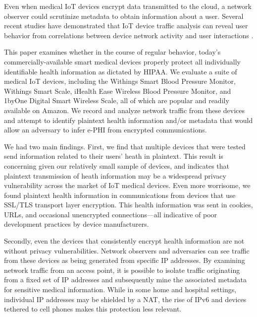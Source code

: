 Even when medical IoT devices encrypt data transmitted to the cloud, a network observer could scrutinize metadata to obtain information about a user.  Several recent studies have demonstrated that IoT device traffic analysis can reveal user behavior  from correlations between device network activity and user interactions \cite{apthorpeIoT}.  

This paper examines whether in the course of regular behavior, today's commercially-available smart medical devices properly protect all individually identifiable health information as dictated by HIPAA.  We evaluate a suite of medical IoT devices, including the Withings Smart Blood Pressure Monitor, Withings Smart Scale, iHealth Ease Wireless Blood Pressure Monitor, and 1byOne Digital Smart Wireless Scale, all of which are popular and readily available on Amazon. We record and analyze network traffic from these devices and attempt to identify plaintext health information and/or metadata that would allow an adversary to infer e-PHI from encrypted communications.  

We had two main findings. First, we find that multiple devices that were tested send information related to their users' heath in plaintext. This result is concerning given our relatively small sample of devices, and indicates that plaintext transmission of heath information may be a widespread privacy vulnerability across the market of IoT medical devices. Even more worrisome, we found plaintext health information in communications from devices that use SSL/TLS transport layer encryption. This health information was sent in cookies, URLs, and occasional unencrypted connections---all indicative of poor development practices by device manufacturers. 

Secondly, even the devices that consistently encrypt health information are not without privacy vulnerabilities. Network observers and adversaries can see traffic from these devices as being generated from specific IP addresses. By examining network traffic from an access point, it is possible to isolate traffic originating from a fixed set of IP addresses and subsequently mine the associated metadata for sensitive medical information. While in some home and hospital settings, individual IP addresses may be shielded by a NAT, the rise of IPv6 and devices tethered to cell phones makes this protection less relevant. 

